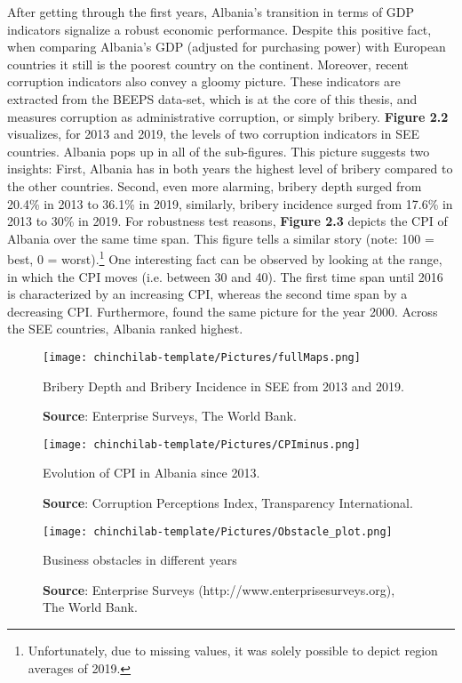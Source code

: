 After getting through the first years, Albania's transition in terms of GDP indicators signalize a robust economic performance. Despite this positive fact, when comparing Albania's GDP (adjusted for purchasing power) with European countries it still is the poorest country on the continent. 
Moreover, recent corruption indicators also convey a gloomy picture. These indicators are extracted from the BEEPS data-set, which is at the core of this thesis, and measures corruption as administrative corruption, or simply bribery. {\bf Figure 2.2} visualizes, for 2013 and 2019, the levels of two corruption indicators in SEE countries. Albania pops up in all of the sub-figures. This picture suggests two insights: First, Albania has in both years the highest level of bribery compared to the other countries. Second, even more alarming, bribery depth surged from 20.4\% in 2013 to 36.1\% in 2019, similarly, bribery incidence surged from 17.6\% in 2013 to 30\% in 2019. For robustness test reasons, {\bf Figure 2.3} depicts the CPI of Albania over the same time span. This figure tells a similar story (note: 100 = best, 0 = worst).\footnote{Unfortunately, due to missing values, it was solely possible to depict region averages of 2019.} One interesting fact can be observed by looking at the range, in which the CPI moves (i.e. between 30 and 40). The first time span until 2016 is characterized by an increasing CPI, whereas the second time span by a decreasing CPI. Furthermore,  \citet[p. 8]{worldbank2000} found the same picture for the year 2000. Across the SEE countries, Albania ranked highest.
\begin{figure}
    \centering
    \texttt{[image: chinchilab-template/Pictures/fullMaps.png]}
    \caption{Bribery Depth and Bribery Incidence in SEE from 2013 and 2019.}
    \caption*{\textbf{Source}: Enterprise Surveys, The World Bank.}
    \label{fig:my_label}
\end{figure}
\begin{figure}[h]
    \centering
    \texttt{[image: chinchilab-template/Pictures/CPIminus.png]}
    \caption{Evolution of CPI in Albania since 2013.}
    \caption*{\textbf{Source}: Corruption Perceptions Index, Transparency International.}
    \label{fig:my_label}
\end{figure}
\begin{figure}[!htb]
    \centering
    \texttt{[image: chinchilab-template/Pictures/Obstacle\_plot.png]}
    \caption{Business obstacles in different years}
    \caption*{\textbf{Source}: Enterprise Surveys (http://www.enterprisesurveys.org), The World Bank.}
    \label{fig:my_label}
\end{figure}

